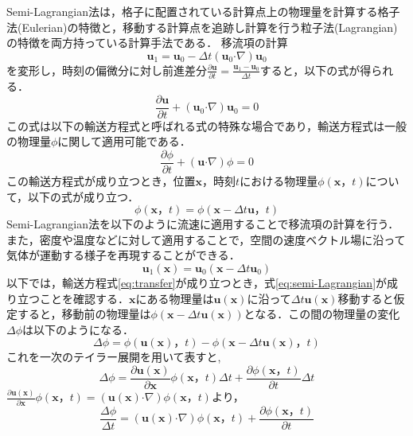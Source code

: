 \documentclass[a4j,12pt]{jreport}
\begin{document}
Semi-Lagrangian法は，格子に配置されている計算点上の物理量を計算する格子法(Eulerian)の特徴と，移動する計算点を追跡し計算を行う粒子法(Lagrangian)の特徴を両方持っている計算手法である．
移流項の計算$$\bm{u}_1 = \bm{u}_0  - \varDelta t (\bm{u}_0  \boldsymbol{\cdot}\nabla) \bm{u}_0$$を変形し，時刻の偏微分に対し前進差分$\frac{\partial \bm{u}}{\partial t} = \frac{\bm{u}_1 - \bm{u}_0}{ \varDelta t }$すると，以下の式が得られる．
\[
\frac{\partial \bm{u}}{\partial t}   +(\bm{u}_0  \boldsymbol{\cdot}\nabla) \bm{u}_0 = 0
\]
この式は以下の輸送方程式と呼ばれる式の特殊な場合であり，輸送方程式は一般の物理量$\phi$に関して適用可能である．
\begin{equation}\label{eq:transfer}
	\frac{\partial {\phi}}{\partial t}  +(\bm{u}  \boldsymbol{\cdot}\nabla) {\phi} = 0
\end{equation} 
この輸送方程式が成り立つとき，位置$\bm{x}$，時刻$t$における物理量$\phi(\bm{x}，t)$について，以下の式が成り立つ．
\begin{equation}\label{eq:semi-Lagrangian}
	{\phi}(\bm{x}，t) = {\phi}(\bm{x}  - \varDelta t \bm{u}，t)
\end{equation} 
Semi-Lagrangian法を以下のように流速に適用することで移流項の計算を行う．また，密度や温度などに対して適用することで，空間の速度ベクトル場に沿って気体が運動する様子を再現することができる．
\[
	\bm{u}_1(\bm{x}) = \bm{u}_0(\bm{x}  - \varDelta t \bm{u}_0)
\]
以下では，輸送方程式\ref{eq:transfer}が成り立つとき，式\ref{eq:semi-Lagrangian}が成り立つことを確認する．$\bm{x}$にある物理量は$\bm{u} (\bm{x}) $に沿って$\varDelta t\bm{u} (\bm{x})$移動すると仮定すると，移動前の物理量は$\phi(\bm{x} -  \varDelta t\bm{u} (\bm{x}))$となる．この間の物理量の変化$\varDelta {\phi}$は以下のようになる．
\[
\varDelta \phi = \phi( \bm{u} (\bm{x})，t) - \phi (\bm{x} - \varDelta t\bm{u} (\bm{x})，t)
\]
これを一次のテイラー展開を用いて表すと,
\[
\varDelta \phi   = \frac{\partial \bm{u} (\bm{x}) }{\partial \bm{x}}\phi (\bm{x}，t) \varDelta t + \frac{\partial \phi (\bm{x}，t) }{\partial t}\varDelta t
\]
$\frac{\partial \bm{u} (\bm{x}) }{\partial \bm{x}}\phi (\bm{x}，t)= (\bm{u}(\bm{x}) \boldsymbol{\cdot}\nabla)\phi(\bm{x}，t)$より，
\[
 \frac{\varDelta \phi}{\varDelta t} =  (\bm{u}(\bm{x})\boldsymbol{\cdot}\nabla) \phi(\bm{x}，t) + \frac{\partial \phi(\bm{x}，t) }{\partial t}
 \]
 
\end{document}
